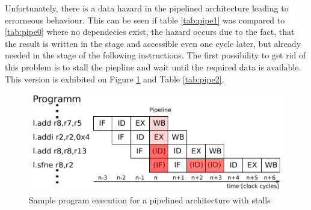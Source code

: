 Unfortunately, there is a data hazard in the pipelined architecture leading to errorneous behaviour. This can be seen if table \ref{tab:pipe1} was compared to \ref{tab:pipe0} where no dependecies exist, the hazard occurs due to the fact, that the result is written in the  stage and accessible even one cycle later, but already needed in the  stage of the following instructions. The first possibility to get rid of this problem is to stall the piepline and wait until the required data is available. This version is exhibited on Figure \ref{fig:pipe2} and Table \ref{tab:pipe2}.


\begin{figure}[htbp]
  \centering
  \includegraphics[scale=0.8]{./figures/pipeline2}
  \caption{Sample program execution for a pipelined architecture with stalls}
  \label{fig:pipe2}
\end{figure}

